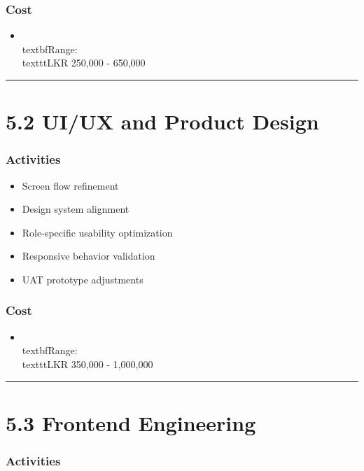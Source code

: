 \documentclass[11pt,a4paper]{article}
\begin{document}
\subsubsection{Cost}

\begin{itemize}
\item \\textbf{Range:} \\texttt{LKR 250,000 - 650,000}
\end{itemize}

\bigskip\hrule\bigskip

\section{5.2 UI/UX and Product Design}

\subsubsection{Activities}

\begin{itemize}
\item Screen flow refinement
\item Design system alignment
\item Role-specific usability optimization
\item Responsive behavior validation
\item UAT prototype adjustments
\end{itemize}

\subsubsection{Cost}

\begin{itemize}
\item \\textbf{Range:} \\texttt{LKR 350,000 - 1,000,000}
\end{itemize}

\bigskip\hrule\bigskip

\section{5.3 Frontend Engineering}

\subsubsection{Activities}
\end{document}

